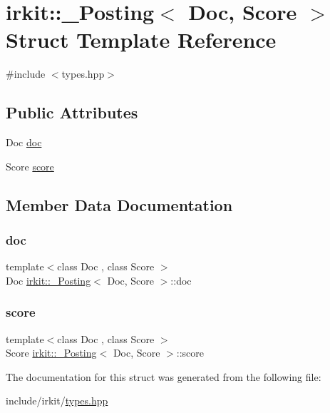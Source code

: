 \hypertarget{structirkit_1_1__Posting}{}\section{irkit\+:\+:\+\_\+\+Posting$<$ Doc, Score $>$ Struct Template Reference}
\label{structirkit_1_1__Posting}


{\ttfamily \#include $<$types.\+hpp$>$}

\subsection*{Public Attributes}
\begin{DoxyCompactItemize}
\item 
Doc \hyperlink{structirkit_1_1__Posting_a6ee624b39c69f2b8701701ecc8fe6a0b}{doc}
\item 
Score \hyperlink{structirkit_1_1__Posting_a3c5cc3b179d8fb975d3356847e34955f}{score}
\end{DoxyCompactItemize}


\subsection{Member Data Documentation}
\mbox{\label{structirkit_1_1__Posting_a6ee624b39c69f2b8701701ecc8fe6a0b}} 
\subsubsection{\texorpdfstring{doc}{doc}}
{\footnotesize\ttfamily template$<$class Doc , class Score $>$ \\
Doc \hyperlink{structirkit_1_1__Posting}{irkit\+::\+\_\+\+Posting}$<$ Doc, Score $>$\+::doc}

\mbox{\label{structirkit_1_1__Posting_a3c5cc3b179d8fb975d3356847e34955f}} 
\subsubsection{\texorpdfstring{score}{score}}
{\footnotesize\ttfamily template$<$class Doc , class Score $>$ \\
Score \hyperlink{structirkit_1_1__Posting}{irkit\+::\+\_\+\+Posting}$<$ Doc, Score $>$\+::score}



The documentation for this struct was generated from the following file\+:\begin{DoxyCompactItemize}
\item 
include/irkit/\hyperlink{types_8hpp}{types.\+hpp}\end{DoxyCompactItemize}
